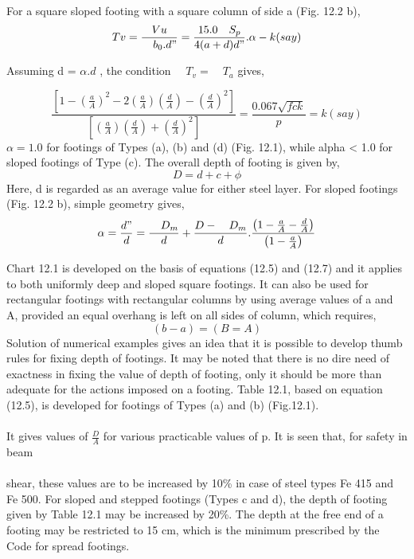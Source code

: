 \documentclass{book}
\begin{document}
 For a square sloped footing with a square column of side a (Fig. 12.2 b),
\begin{equation}
Tv=\frac{Vu}{\quad{b_0}.d "}
=\frac{15.0\quad{S_p}}{4(a+d)d"}.\alpha-k(say)
\end{equation}

Assuming d = $\alpha.d$ , the condition $\quad{T_v}=\quad{T_a}$  gives,

\begin{equation}
\frac{\left[1-\left( \frac{a}{A} \right)^2-2\left(\frac{a}{A}\right)\left(\frac{d}{A}\right)-\left(\frac{d}{A} \right)^2 \right]}
{\left[\left(\frac{a}{A}\right)\left(\frac{d}{A}\right)+\left(\frac{d}{A}\right)^2 \right]}
=\frac{0.067\sqrt{fck}}{p}
=k(say)
\end{equation}
\newpage
$\alpha = 1.0$ for footings of Types (a), (b) and (d) (Fig. 12.1), while alpha < 1.0 for sloped footings of
Type (c). The overall depth of footing is given by,
\begin{equation}
D=d+c+\phi
\end{equation}
Here, d is regarded as an average value for either steel layer. For sloped footings (Fig. 12.2
b), simple geometry gives,
\begin{equation}
\alpha=\frac{d"}{d}=\frac{\quad{D_m}}{d}+\frac{D-\quad{D_m}}{d}.\frac{\left( 1-\frac{a}{A}-\frac{d}{A}\right)}{\left( 1-\frac{a}{A}\right)}
\end{equation}
\par Chart 12.1 is developed on the basis of equations (12.5) and (12.7) and it applies to both
uniformly deep and sloped square footings. It can also be used for rectangular footings with
rectangular columns by using average values of a and A, provided an equal overhang is left
on all sides of column, which requires,
\begin{equation}
(b-a)=(B=A)
\end{equation}
  Solution of numerical examples gives an idea that it is possible to develop thumb rules for fixing depth of footings. It may be noted that there is no dire need of exactness in fixing the value of depth of footing, only it should be more than adequate for the actions imposed on a footing. Table 12.1, based on equation (12.5), is developed for footings of Types (a) and (b) (Fig.12.1).\\\\
 It gives values of $\frac{D}{A}$ for various practicable values of p. It is seen that, for safety in beam\\ \\shear, these values are  to be increased by 10\% in case of steel types Fe 415 and Fe 500. For sloped and stepped footings (Types c and d), the depth of footing given by Table 12.1 may be increased by 20\%. The depth at the free end of a footing may be restricted to 15 cm, which is the minimum prescribed by the Code for spread footings.
\end{document}
